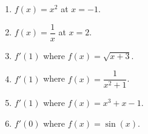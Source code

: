 \documentclass[12pt]{exam}
\begin{document}
\begin{enumerate}
    \begin{enumerate}
      \item $f(x) = x^2$ at $x = -1$.
        \vfill
      \item $f(x) = \dfrac{1}{x}$ at $x = 2$.
        \vfill
        \newpage
      \item $f'(1)$ where $f(x) = \sqrt{x + 3}$.
        \vfill
      \item $f'(1)$ where $f(x) = \dfrac{1}{x^2 + 1}$.
      \vfill
      \newpage
      \item $f'(1)$ where $f(x) = x^3 + x - 1$.
        \vfill
      \item $f'(0)$ where $f(x) = \sin(x)$.
        \vfill
    \end{enumerate}
\end{enumerate}



\end{document}

